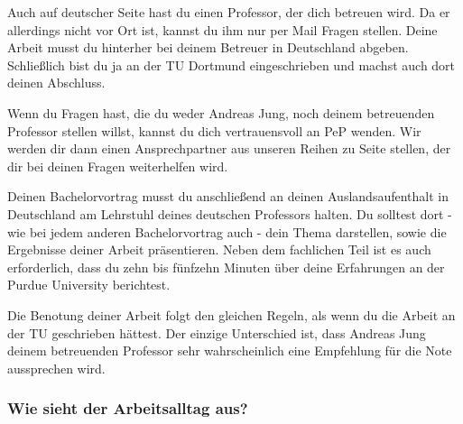 \documentclass[
  paper=a4,
  fontsize=12pt,
  DIV=16,
  headheight=52pt,
  footheight=45pt,
  headinclude,
  parskip=full,
]{scrartcl}
\begin{document}
Auch auf deutscher Seite hast du einen Professor, der dich betreuen wird.
Da er allerdings nicht vor Ort ist, kannst du ihm nur per Mail Fragen stellen.
Deine Arbeit musst du hinterher bei deinem Betreuer in Deutschland abgeben.
Schließlich bist du ja an der TU Dortmund eingeschrieben und machst auch dort
deinen Abschluss.

Wenn du Fragen hast, die du weder Andreas Jung, noch deinem betreuenden Professor
stellen willst, kannst du dich vertrauensvoll an PeP wenden.
Wir werden dir dann einen Ansprechpartner aus unseren Reihen zu Seite stellen,
der dir bei deinen Fragen weiterhelfen wird.

Deinen Bachelorvortrag musst du anschließend an deinen Auslandsaufenthalt in
Deutschland am Lehrstuhl deines deutschen Professors halten.
Du solltest dort - wie bei jedem anderen Bachelorvortrag auch - dein Thema
darstellen, sowie die Ergebnisse deiner Arbeit präsentieren.
Neben dem fachlichen Teil ist es auch erforderlich, dass du zehn bis fünfzehn
Minuten über deine Erfahrungen an der Purdue University berichtest.

Die Benotung deiner Arbeit folgt den gleichen Regeln, als wenn du die Arbeit an
der TU geschrieben hättest.
Der einzige Unterschied ist, dass Andreas Jung deinem betreuenden Professor
sehr wahrscheinlich eine Empfehlung für die Note aussprechen wird.

\subsubsection*{Wie sieht der Arbeitsalltag aus?}
\end{document}
